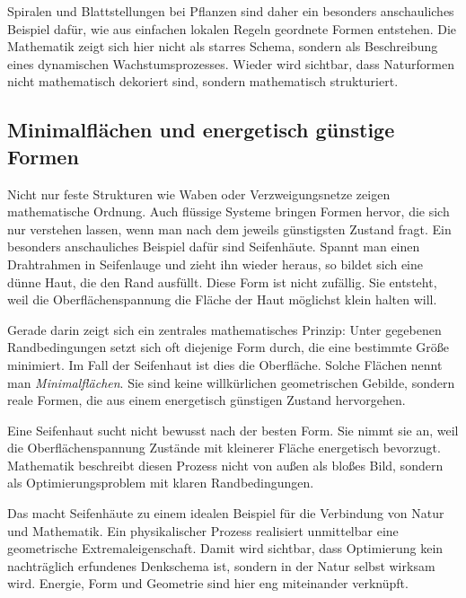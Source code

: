 Spiralen und Blattstellungen bei Pflanzen sind daher ein besonders anschauliches Beispiel dafür,
wie aus einfachen lokalen Regeln geordnete Formen entstehen.
Die Mathematik zeigt sich hier nicht als starres Schema,
sondern als Beschreibung eines dynamischen Wachstumsprozesses.
Wieder wird sichtbar,
dass Naturformen nicht mathematisch dekoriert sind,
sondern mathematisch strukturiert.


\subsection{Minimalflächen und energetisch günstige Formen}

Nicht nur feste Strukturen wie Waben oder Verzweigungsnetze zeigen mathematische Ordnung.
Auch flüssige Systeme bringen Formen hervor,
die sich nur verstehen lassen,
wenn man nach dem jeweils günstigsten Zustand fragt.
Ein besonders anschauliches Beispiel dafür sind Seifenhäute.
Spannt man einen Drahtrahmen in Seifenlauge
und zieht ihn wieder heraus,
so bildet sich eine dünne Haut,
die den Rand ausfüllt.
Diese Form ist nicht zufällig.
Sie entsteht,
weil die Oberflächenspannung die Fläche der Haut möglichst klein halten will.

Gerade darin zeigt sich ein zentrales mathematisches Prinzip:
Unter gegebenen Randbedingungen setzt sich oft diejenige Form durch,
die eine bestimmte Größe minimiert.
Im Fall der Seifenhaut ist dies die Oberfläche.
Solche Flächen nennt man \emph{Minimalflächen}.
Sie sind keine willkürlichen geometrischen Gebilde,
sondern reale Formen,
die aus einem energetisch günstigen Zustand hervorgehen.

\begin{DidacticBox}
	Eine Seifenhaut \glqq sucht\grqq{} nicht bewusst nach der besten Form.
	Sie nimmt sie an,
	weil die Oberflächenspannung Zustände mit kleinerer Fläche energetisch bevorzugt.
	Mathematik beschreibt diesen Prozess nicht von außen als bloßes Bild,
	sondern als Optimierungsproblem mit klaren Randbedingungen.
\end{DidacticBox}

Das macht Seifenhäute zu einem idealen Beispiel für die Verbindung von Natur und Mathematik.
Ein physikalischer Prozess realisiert unmittelbar eine geometrische Extremaleigenschaft.
Damit wird sichtbar,
dass Optimierung kein nachträglich erfundenes Denkschema ist,
sondern in der Natur selbst wirksam wird.
Energie,
Form
und Geometrie sind hier eng miteinander verknüpft.

